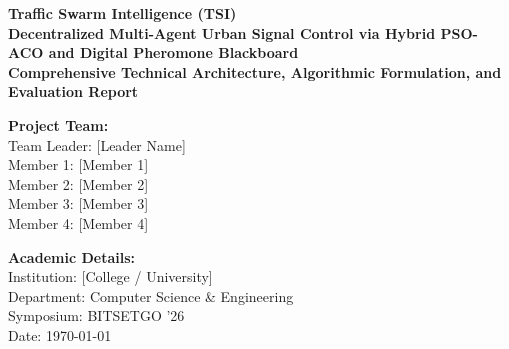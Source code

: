 \documentclass[11pt,a4paper]{article}
\begin{document}
\begin{titlepage}
    \centering
    \vspace*{1cm}
    
    {\Huge \textbf{\color{primaryblue}Traffic Swarm Intelligence (TSI)}}\\[0.5cm]
    {\Large \textbf{Decentralized Multi-Agent Urban Signal Control via Hybrid PSO-ACO and Digital Pheromone Blackboard}}\\[1.5cm]
    
    \textbf{\large Comprehensive Technical Architecture, Algorithmic Formulation, and Evaluation Report}\\[2cm]
    
    \begin{minipage}{0.48\textwidth}
        \begin{flushleft} \large
            \textbf{Project Team:}\\
            Team Leader: [Leader Name]\\
            Member 1: [Member 1]\\
            Member 2: [Member 2]\\
            Member 3: [Member 3]\\
            Member 4: [Member 4]
        \end{flushleft}
    \end{minipage}
    \begin{minipage}{0.48\textwidth}
        \begin{flushright} \large
            \textbf{Academic Details:}\\
            Institution: [College / University]\\
            Department: Computer Science \& Engineering\\
            Symposium: BITSETGO '26\\
            Date: \today
        \end{flushright}
    \end{minipage}
    

\end{titlepage}
\end{document}

